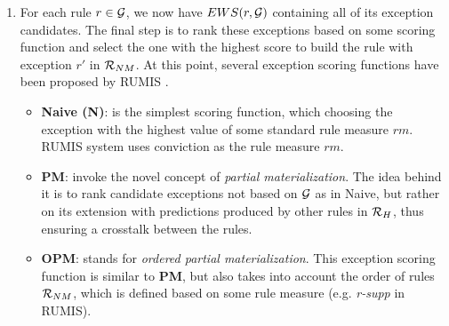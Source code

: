\begin{enumerate}
\item For each rule $r \in \mathcal{G}$, we now have $EWS(r,\mathcal{G})$ containing all of its exception candidates. The final step is to rank these exceptions based on some scoring function and select the one with the highest score to build the rule with exception $r'$ in $\mathcal{R}_{NM}$. At this point, several exception scoring functions have been proposed by RUMIS \cite{rumis}.
\begin{itemize}
\item \textbf{Naive (N)}: is the simplest scoring function, which choosing the exception with the highest value of some standard rule measure $rm$. RUMIS system uses conviction as the rule measure $rm$.
\item \textbf{PM}: invoke the novel concept of \textit{partial materialization}. The idea behind it is to rank candidate exceptions not based on $\mathcal{G}$ as in Naive, but rather on its
extension with predictions produced by other rules in $\mathcal{R}_H$, thus ensuring a crosstalk between the rules.
\item \textbf{OPM}: stands for \textit{ordered partial materialization}. This exception scoring function is similar to \textbf{PM}, but also takes into account the order of rules $\mathcal{R}_{NM}$, which is defined based on some rule measure (e.g. \textit{r-supp} in RUMIS).

\end{itemize}
\end{enumerate}


